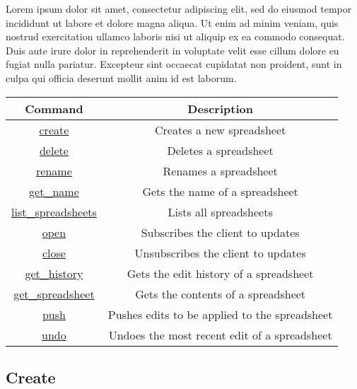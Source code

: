 Lorem ipsum dolor sit amet, consectetur adipiscing elit, sed do eiusmod tempor incididunt ut labore et dolore magna aliqua. Ut enim ad minim veniam, quis nostrud exercitation ullamco laboris nisi ut aliquip ex ea commodo consequat. Duis aute irure dolor in reprehenderit in voluptate velit esse cillum dolore eu fugiat nulla pariatur. Excepteur sint occaecat cupidatat non proident, sunt in culpa qui officia deserunt mollit anim id est laborum.

\begin{table}[h!]
    \begin{center}
        \begin{tabular}{|c|c|}\hline
        Command & Description \\\hline
        \hyperref[sec:message:create]{create} & Creates a new spreadsheet \\\hline
        \hyperref[sec:message:delete]{delete} & Deletes a spreadsheet \\\hline
        \hyperref[sec:message:rename]{rename} & Renames a spreadsheet \\\hline
        \hyperref[sec:message:get_name]{get\_name} & Gets the name of a spreadsheet \\\hline
        \hyperref[sec:message:list]{list\_spreadsheets} & Lists all spreadsheets \\\hline
        \hyperref[sec:message:open]{open} & Subscribes the client to updates \\\hline
        \hyperref[sec:message:close]{close} & Unsubscribes the client to updates \\\hline
        \hyperref[sec:message:get_history]{get\_history} & Gets the edit history of a spreadsheet \\\hline
        \hyperref[sec:message:get_spreadsheet]{get\_spreadsheet} & Gets the contents of a spreadsheet \\\hline
        \hyperref[sec:message:push]{push} & Pushes edits to be applied to the spreadsheet \\\hline
        \hyperref[sec:message:undo]{undo} & Undoes the most recent edit of a spreadsheet \\\hline
        \end{tabular}
    \end{center}
\end{table}

\lstset{language=json,frame=single,numbers=none,captionpos=b}

\subsection{Create}
\label{sec:message:create}


